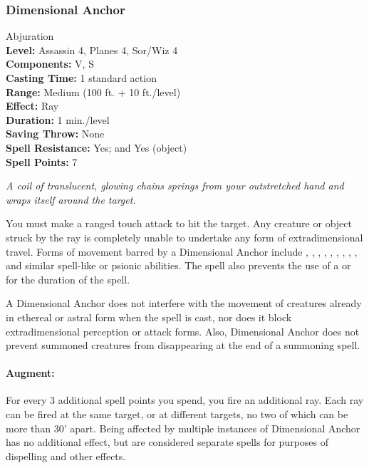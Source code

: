 \subsubsection{Dimensional Anchor}
\label{Spell:DimensionalAnchor}
Abjuration
\\ \textbf{Level:} Assassin 4, Planes 4, Sor/Wiz 4
\\ \textbf{Components:} V, S
\\ \textbf{Casting Time:} 1 standard action
\\ \textbf{Range:} Medium (100 ft. + 10 ft./level)
\\ \textbf{Effect:} Ray
\\ \textbf{Duration:} 1 min./level
\\ \textbf{Saving Throw:} None
\\ \textbf{Spell Resistance:} Yes; and Yes (object)
\\ \textbf{Spell Points:} 7

\emph{A coil of translucent, glowing chains springs from your outstretched hand and wraps itself around the target.}

You must make a ranged touch attack to hit the target. 
Any creature or object struck by the ray is completely unable to undertake any form of extradimensional travel. 
Forms of movement barred by a Dimensional Anchor include , , , , , , , , , 
and similar spell-like or psionic abilities. 
The spell also prevents the use of a  or  for the duration of the spell.

A Dimensional Anchor does not interfere with the movement of creatures already in ethereal or astral form when the spell is cast, nor does it block extradimensional perception or attack forms.
Also, Dimensional Anchor does not prevent summoned creatures from disappearing at the end of a summoning spell.

\paragraph{Augment:} For every 3 additional spell points you spend, you fire an additional ray. Each ray can be fired at the same target, or at different targets, no two of which can be more than 30' apart. Being affected by multiple instances of Dimensional Anchor has no additional effect, but are considered separate spells for purposes of dispelling and other effects.
